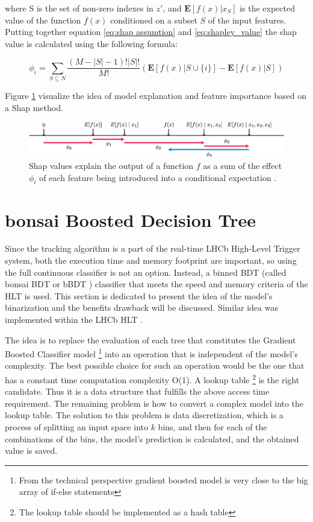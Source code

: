 where S is the set of non-zero indexes in $z'$, and $\mathbf{E}[f(x)|x_S]$ is the expected value of the function $f(x)$ conditioned on a subset $S$ of the input features. Putting together equation \ref{eq:shap assumtion} and \ref{eq:shapley_value} the shap value is calculated using the following formula:

\begin{equation}
        \phi_{i} = \sum_{S \subseteq N} \frac{(M-|S|-1)!|S|!}{M!}(\mathbf{E}[f(x)| S\cup \{i\}] - \mathbf{E}[f(x)|S])
\end{equation}

Figure \ref{fig:shap_exp} visualize the idea of model explanation and feature importance based on a Shap method. 


\begin{figure}[!h]
\centering
\includegraphics{figures/shap_explanation.png}
\caption{Shap values explain the output of a function $f$ as a sum of the effect $\phi_i$ of each feature being introduced into a conditional expectation \cite{shap2}. 
\label{fig:shap_exp}}
\end{figure} 


\section{bonsai Boosted Decision Tree}
\label{sec:bbdt}
Since the tracking algorithm is a part of the real-time LHCb High-Level Trigger system, both the execution time and memory footprint are important, so using the full continuous classifier is not an option. Instead, a binned BDT (called bonsai BDT or bBDT ) classifier that meets the speed and memory criteria of the HLT is used. This section is dedicated to present the idea of the model's binarization and the benefits drawback will be discussed. Similar idea was implemented within the LHCb HLT \cite{bbdt}.


The idea is to replace the evaluation of each tree that constitutes the Gradient Boosted Classifier model \footnote{From the technical perspective gradient boosted model is very close to the big array of if-else statements} into an operation that is independent of the model's complexity. The best possible choice for such an operation would be the one that has a constant time computation complexity O(1).  A lookup table \footnote{The lookup table should be implemented as a hash table} is the right candidate. Thus it is a data structure that fulfills the above access time requirement.   The remaining problem is how to convert a complex model into the lookup table.  The solution to this problem is data discretization, which is a process of splitting an input space into $k$ bins, and then for each of the combinations of the bins, the model's prediction is calculated, and the obtained value is saved. 

